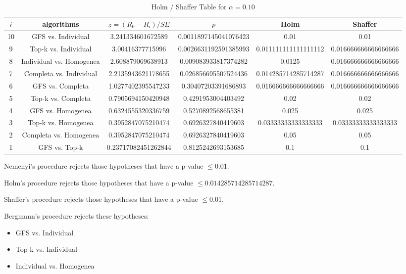 \documentclass[a4paper,10pt]{article}
\begin{document}
\begin{landscape}
\begin{table}[!htp]
\centering\tiny
\caption{Holm / Shaffer Table for $\alpha=0.10$}
\begin{tabular}{cccccc}
$i$&algorithms&$z=(R_0 - R_i)/SE$&$p$&Holm&Shaffer\\
\hline
10&GFS vs. Individual&3.241334601672589&0.0011897145041076423&0.01&0.01\\
9&Top-k vs. Individual&3.00416377715996&0.0026631192591385993&0.011111111111111112&0.016666666666666666\\
8&Individual vs. Homogenea&2.608879069638913&0.009083933817374282&0.0125&0.016666666666666666\\
7&Completa vs. Individual&2.2135943621178655&0.026856695507524436&0.014285714285714287&0.016666666666666666\\
6&GFS vs. Completa&1.0277402395547233&0.30407203391686893&0.016666666666666666&0.016666666666666666\\
5&Top-k vs. Completa&0.7905694150420948&0.4291953004403492&0.02&0.02\\
4&GFS vs. Homogenea&0.6324555320336759&0.5270892568655381&0.025&0.025\\
3&Top-k vs. Homogenea&0.3952847075210474&0.6926327840419603&0.03333333333333333&0.03333333333333333\\
2&Completa vs. Homogenea&0.3952847075210474&0.6926327840419603&0.05&0.05\\
1&GFS vs. Top-k&0.23717082451262844&0.8125242693153685&0.1&0.1\\
\hline
\end{tabular}
\end{table}
Nemenyi's procedure rejects those hypotheses that have a p-value $\le0.01$.


Holm's procedure rejects those hypotheses that have a p-value $\le0.014285714285714287$.


Shaffer's procedure rejects those hypotheses that have a p-value $\le0.01$.


Bergmann's procedure rejects these hypotheses:


\begin{itemize}


\item GFS vs. Individual
\item Top-k vs. Individual
\item Individual vs. Homogenea
\end{itemize}



\end{landscape}
\end{document}
